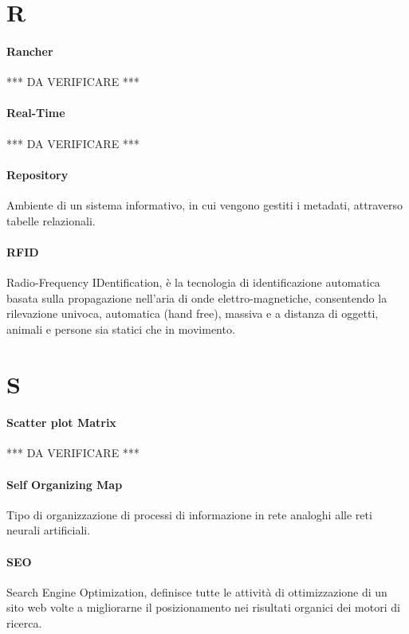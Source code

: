 \documentclass[]{article}
\begin{document}
	\newpage
	
	\section*{R}
	
	\paragraph*{Rancher}
	*** DA VERIFICARE ***
	
	\paragraph*{Real-Time}
	*** DA VERIFICARE ***
	
	\paragraph*{Repository}
	Ambiente di un sistema informativo, in cui vengono gestiti i metadati, attraverso tabelle relazionali.
	
	\paragraph*{RFID}
	Radio-Frequency IDentification, è la tecnologia di identificazione automatica basata sulla propagazione nell'aria di onde elettro-magnetiche, consentendo la rilevazione univoca, automatica (hand free), massiva e a distanza di oggetti, animali e persone sia statici che in movimento.
		
	\newpage	
	
	\section*{S}
	
	\paragraph*{Scatter plot Matrix}
	*** DA VERIFICARE ***
	
	\paragraph*{Self Organizing Map}
	Tipo di organizzazione di processi di informazione in rete analoghi alle reti neurali artificiali.
	
	\paragraph*{SEO}
	Search Engine Optimization, definisce tutte le attività di ottimizzazione di un sito web volte a migliorarne il posizionamento nei risultati organici dei motori di ricerca.
	
\end{document}
